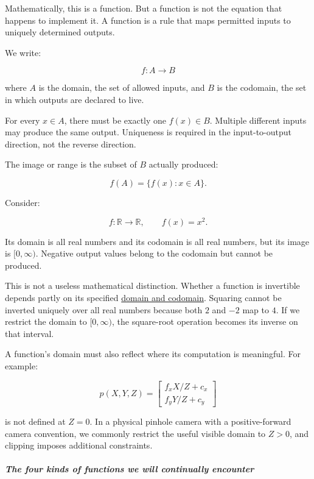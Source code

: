 Mathematically, this is a function. But a function is not the equation that happens to implement it. A function is a rule that maps permitted inputs to uniquely determined outputs.

We write:

\[
f:A\rightarrow B
\]

where \(A\) is the domain, the set of allowed inputs, and \(B\) is the codomain, the set in which outputs are declared to live.

For every \(x\in A\), there must be exactly one \(f(x)\in B\). Multiple different inputs may produce the same output. Uniqueness is required in the input-to-output direction, not the reverse direction.

The image or range is the subset of \(B\) actually produced:

\[
f(A)=\{f(x):x\in A\}.
\]

Consider:

\[
f:\mathbb R\rightarrow\mathbb R,\qquad f(x)=x^2.
\]

Its domain is all real numbers and its codomain is all real numbers, but its image is \([0,\infty)\). Negative output values belong to the codomain but cannot be produced.

This is not a useless mathematical distinction. Whether a function is invertible depends partly on its specified \hyperref[01-foundations-i-ch020-functions-limits-continuity-and-scalar-change]{domain and codomain}. Squaring cannot be inverted uniquely over all real numbers because both \(2\) and \(-2\) map to \(4\). If we restrict the domain to \([0,\infty)\), the square-root operation becomes its inverse on that interval.

A function's domain must also reflect where its computation is meaningful. For example:

\[
p(X,Y,Z)= \begin{bmatrix} f_xX/Z+c_x\\ f_yY/Z+c_y \end{bmatrix}
\]

is not defined at \(Z=0\). In a physical pinhole camera with a positive-forward camera convention, we commonly restrict the useful visible domain to \(Z>0\), and clipping imposes additional constraints.

\subparagraph{The four kinds of functions we will continually encounter}\label{01-foundations-i-ch020-the-four-kinds-of-functions-we-will-continually-encounter}

\hypertarget{01-foundations-i-ch020-the-four-kinds-of-functions-we-will-continually-encounter}{}

